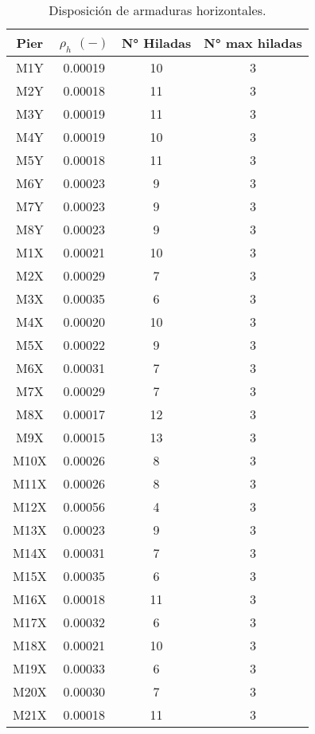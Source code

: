 \begin{table}[H]
  \centering
  \caption{Disposición de armaduras horizontales.}
  \begin{tabular}{cccc}
    \hline
    \textbf{Pier} & \boldmath{}\textbf{$\rho_h$ $ (-)$}\unboldmath{} & \textbf{N° Hiladas} & \textbf{N° max hiladas} \bigstrut\\
    \hline
    M1Y   & 0.00019 & 10    & 3 \bigstrut[t]\\
    M2Y   & 0.00018 & 11    & 3 \\
    M3Y   & 0.00019 & 11    & 3 \\
    M4Y   & 0.00019 & 10    & 3 \\
    M5Y   & 0.00018 & 11    & 3 \\
    M6Y   & 0.00023 & 9     & 3 \\
    M7Y   & 0.00023 & 9     & 3 \\
    M8Y   & 0.00023 & 9     & 3 \\
    M1X   & 0.00021 & 10    & 3 \\
    M2X   & 0.00029 & 7     & 3 \\
    M3X   & 0.00035 & 6     & 3 \\
    M4X   & 0.00020 & 10    & 3 \\
    M5X   & 0.00022 & 9     & 3 \\
    M6X   & 0.00031 & 7     & 3 \\
    M7X   & 0.00029 & 7     & 3 \\
    M8X   & 0.00017 & 12    & 3 \\
    M9X   & 0.00015 & 13    & 3 \\
    M10X  & 0.00026 & 8     & 3 \\
    M11X  & 0.00026 & 8     & 3 \\
    M12X  & 0.00056 & 4     & 3 \\
    M13X  & 0.00023 & 9     & 3 \\
    M14X  & 0.00031 & 7     & 3 \\
    M15X  & 0.00035 & 6     & 3 \\
    M16X  & 0.00018 & 11    & 3 \\
    M17X  & 0.00032 & 6     & 3 \\
    M18X  & 0.00021 & 10    & 3 \\
    M19X  & 0.00033 & 6     & 3 \\
    M20X  & 0.00030 & 7     & 3 \\
    M21X  & 0.00018 & 11    & 3 \bigstrut[b]\\
    \hline
  \end{tabular}
  \label{esca}
\end{table}

